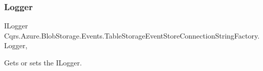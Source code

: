 \subsubsection{\texorpdfstring{Logger}{Logger}}
{\footnotesize\ttfamily I\+Logger Cqrs.\+Azure.\+Blob\+Storage.\+Events.\+Table\+Storage\+Event\+Store\+Connection\+String\+Factory.\+Logger\hspace{0.3cm}{\ttfamily [get]}, {\ttfamily [protected]}}



Gets or sets the I\+Logger. 

